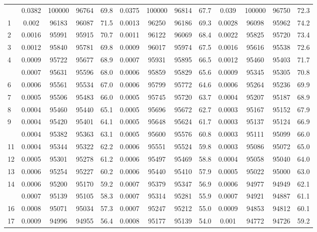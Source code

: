 \documentclass[
  14pt,
]{article}
\begin{document}
\begin{longtable}[t]{lcccccccccccc}
\endfoot
\bottomrule
\endlastfoot
0 & 0.0382 & 100000 & 96764 & 69.8 & 0.0375 & 100000 & 96814 & 67.7 & 0.039 & 100000 & 96750 & 72.3\\
1 & 0.002 & 96183 & 96087 & 71.5 & 0.0013 & 96250 & 96186 & 69.3 & 0.0028 & 96098 & 95962 & 74.2\\
2 & 0.0016 & 95991 & 95915 & 70.7 & 0.0011 & 96122 & 96069 & 68.4 & 0.0022 & 95825 & 95720 & 73.4\\
3 & 0.0012 & 95840 & 95781 & 69.8 & 0.0009 & 96017 & 95974 & 67.5 & 0.0016 & 95616 & 95538 & 72.6\\
4 & 0.0009 & 95722 & 95677 & 68.9 & 0.0007 & 95931 & 95895 & 66.5 & 0.0012 & 95460 & 95403 & 71.7\\
\addlinespace
5 & 0.0007 & 95631 & 95596 & 68.0 & 0.0006 & 95859 & 95829 & 65.6 & 0.0009 & 95345 & 95305 & 70.8\\
6 & 0.0006 & 95561 & 95534 & 67.0 & 0.0006 & 95799 & 95772 & 64.6 & 0.0006 & 95264 & 95236 & 69.9\\
7 & 0.0005 & 95506 & 95483 & 66.0 & 0.0005 & 95745 & 95720 & 63.7 & 0.0004 & 95207 & 95187 & 68.9\\
8 & 0.0004 & 95460 & 95440 & 65.1 & 0.0005 & 95696 & 95672 & 62.7 & 0.0003 & 95167 & 95152 & 67.9\\
9 & 0.0004 & 95420 & 95401 & 64.1 & 0.0005 & 95648 & 95624 & 61.7 & 0.0003 & 95137 & 95124 & 66.9\\
\addlinespace
10 & 0.0004 & 95382 & 95363 & 63.1 & 0.0005 & 95600 & 95576 & 60.8 & 0.0003 & 95111 & 95099 & 66.0\\
11 & 0.0004 & 95344 & 95322 & 62.2 & 0.0006 & 95551 & 95524 & 59.8 & 0.0003 & 95086 & 95072 & 65.0\\
12 & 0.0005 & 95301 & 95278 & 61.2 & 0.0006 & 95497 & 95469 & 58.8 & 0.0004 & 95058 & 95040 & 64.0\\
13 & 0.0006 & 95254 & 95227 & 60.2 & 0.0006 & 95440 & 95410 & 57.9 & 0.0005 & 95022 & 95000 & 63.0\\
14 & 0.0006 & 95200 & 95170 & 59.2 & 0.0007 & 95379 & 95347 & 56.9 & 0.0006 & 94977 & 94949 & 62.1\\
\addlinespace
15 & 0.0007 & 95139 & 95105 & 58.3 & 0.0007 & 95314 & 95281 & 55.9 & 0.0007 & 94921 & 94887 & 61.1\\
16 & 0.0008 & 95071 & 95034 & 57.3 & 0.0007 & 95247 & 95212 & 55.0 & 0.0009 & 94853 & 94812 & 60.1\\
17 & 0.0009 & 94996 & 94955 & 56.4 & 0.0008 & 95177 & 95139 & 54.0 & 0.001 & 94772 & 94726 & 59.2\\

\end{longtable}
\end{document}
